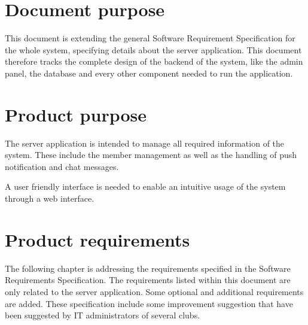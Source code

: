 \pagestyle{fancy}
\lhead{}
\renewcommand{\headrulewidth}{0pt}
\setlength{\headheight}{14pt}

\chapter{Document purpose}
This document is extending the general Software Requirement Specification for the whole system, specifying details about the server application. This document therefore tracks the complete design of the backend of the system, like the admin panel, the database and every other component needed to run the application.

\chapter{Product purpose}
The server application is intended to manage all required information of the system. These include the member management as well as the handling of push notification and chat messages.

A user friendly interface is needed to enable an intuitive usage of the system through a web interface.

\chapter{Product requirements}
The following chapter is addressing the requirements specified in the Software Requirements Specification. The requirements listed within this document are only related to the server application. Some optional and additional requirements are added. These specification include some improvement suggestion that have been suggested by IT administrators of several clubs.

